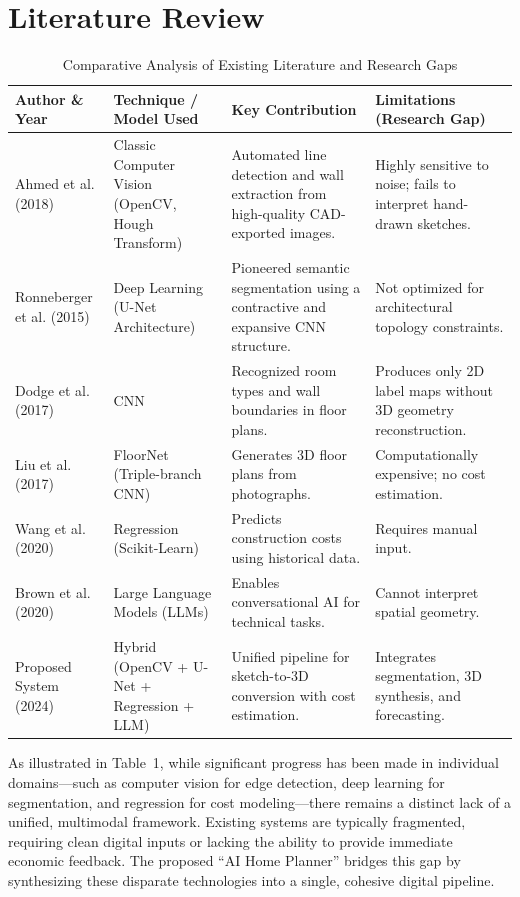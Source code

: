 \documentclass[10pt, conference, a4paper]{IEEEtran}
\begin{document}
\section{Literature Review}

\begin{table}[htbp]
\caption{Comparative Analysis of Existing Literature and Research Gaps \cite{4, 11}}
\centering
\renewcommand{\arraystretch}{1.2}
\begin{tabularx}{\textwidth}{|l|l|X|X|}
\hline
\textbf{Author \& Year} & \textbf{Technique / Model Used} & \textbf{Key Contribution} & \textbf{Limitations (Research Gap)} \\
\hline
Ahmed et al. (2018) & Classic Computer Vision (OpenCV, Hough Transform) & Automated line detection and wall extraction from high-quality CAD-exported images. & Highly sensitive to noise; fails to interpret hand-drawn sketches. \\
\hline
Ronneberger et al. (2015) \cite{1} & Deep Learning (U-Net Architecture) & Pioneered semantic segmentation using a contractive and expansive CNN structure. & Not optimized for architectural topology constraints. \\
\hline
Dodge et al. (2017) & CNN & Recognized room types and wall boundaries in floor plans. & Produces only 2D label maps without 3D geometry reconstruction. \\
\hline
Liu et al. (2017) \cite{10} & FloorNet (Triple-branch CNN) & Generates 3D floor plans from photographs. & Computationally expensive; no cost estimation. \\
\hline
Wang et al. (2020) \cite{13} & Regression (Scikit-Learn) & Predicts construction costs using historical data. & Requires manual input. \\
\hline
Brown et al. (2020) & Large Language Models (LLMs) & Enables conversational AI for technical tasks. & Cannot interpret spatial geometry. \\
\hline
Proposed System (2024) & Hybrid (OpenCV + U-Net + Regression + LLM) & Unified pipeline for sketch-to-3D conversion with cost estimation. & Integrates segmentation, 3D synthesis, and forecasting. \\
\hline
\end{tabularx}
\end{table}

As illustrated in Table~1, while significant progress has been made in individual domains—such as computer vision for edge detection, deep learning for segmentation, and regression for cost modeling—there remains a distinct lack of a unified, multimodal framework. Existing systems are typically fragmented, requiring clean digital inputs or lacking the ability to provide immediate economic feedback. The proposed ``AI Home Planner'' bridges this gap by synthesizing these disparate technologies into a single, cohesive digital pipeline.
\end{document}
